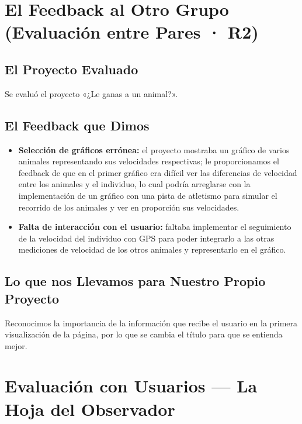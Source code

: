 \documentclass[11pt,a4paper]{article}
\begin{document}
	\section{El Feedback al Otro Grupo (Evaluación entre Pares · R2)}
	
	\subsection{El Proyecto Evaluado}
	Se evaluó el proyecto «¿Le ganas a un animal?».
	
	\subsection{El Feedback que Dimos}
	\begin{itemize}
		\item \textbf{Selección de gráficos errónea:} el proyecto mostraba un gráfico de varios animales representando sus velocidades respectivas; le proporcionamos el feedback de que en el primer gráfico era difícil ver las diferencias de velocidad entre los animales y el individuo, lo cual podría arreglarse con la implementación de un gráfico con una pista de atletismo para simular el recorrido de los animales y ver en proporción sus velocidades.
		\item \textbf{Falta de interacción con el usuario:} faltaba implementar el seguimiento de la velocidad del individuo con GPS para poder integrarlo a las otras mediciones de velocidad de los otros animales y representarlo en el gráfico.
	\end{itemize}
	
	\subsection{Lo que nos Llevamos para Nuestro Propio Proyecto}
	Reconocimos la importancia de la información que recibe el usuario en la primera visualización de la página, por lo que se cambia el título para que se entienda mejor.
	
	\vspace{0.4cm}
	
	\section{Evaluación con Usuarios — La Hoja del Observador}
	
\end{document}
